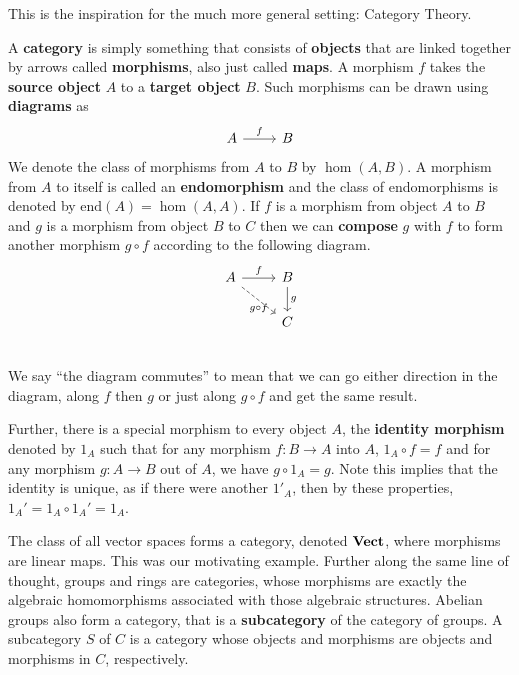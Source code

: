 \begin{appendices}
	
	This is the inspiration for the much more general setting: Category Theory. 
	
	A \textbf{category} is simply something that consists of \textbf{objects} that are linked together by arrows called \textbf{morphisms}, also just called \textbf{maps}. A morphism $f$ takes the \textbf{source object} $A$ to a \textbf{target object} $B$. Such morphisms can be drawn using \textbf{diagrams} as
	\[ 
	\begin{tikzcd}
	A \arrow[r, "f"] & B
	\end{tikzcd}
	\]
	We denote the class of morphisms from $A$ to $B$ by $\hom(A,B)$. A morphism from $A$ to itself is called an \textbf{endomorphism} and the class of endomorphisms is denoted by $\text{end}(A) = \hom(A,A)$. If $f$ is a morphism from object $A$ to $B$ and $g$ is a morphism from object $B$ to $C$ then we can \textbf{compose} $g$ with $f$ to form another morphism $g \circ f$ according to the following diagram.
	\[ 
	\begin{tikzcd}
	A \arrow[r, "f"]  \arrow[dashrightarrow, rd, "g \circ f" below] & B \arrow[d, "g"] \\
	  & C \\
	\end{tikzcd}
	\]
	We say ``the diagram commutes'' to mean that we can go either direction in the diagram, along $f$ then $g$ or just along $g \circ f$ and get the same result.
	
	Further, there is a special morphism to every object $A$, the \textbf{identity morphism} denoted by $1_A$ such that for any morphism $f: B \rightarrow A$ into $A$, $1_A \circ f = f$ and for any morphism $g: A \rightarrow B$ out of $A$, we have $g \circ 1_A = g$. Note this implies that the identity is unique, as if there were another $1'_A$, then by these properties, $1_A' = 1_A \circ 1_A' = 1_A$.
	
	The class of all vector spaces forms a category, denoted $\text{\textbf{Vect}}$, where morphisms are linear maps. This was our motivating example. Further along the same line of thought, groups and rings are categories, whose morphisms are exactly the algebraic homomorphisms associated with those algebraic structures. Abelian groups also form a category, that is a \textbf{subcategory} of the category of groups. A subcategory $S$ of $C$ is a category whose objects and morphisms are objects and morphisms in $C$, respectively.
	

\end{appendices}
